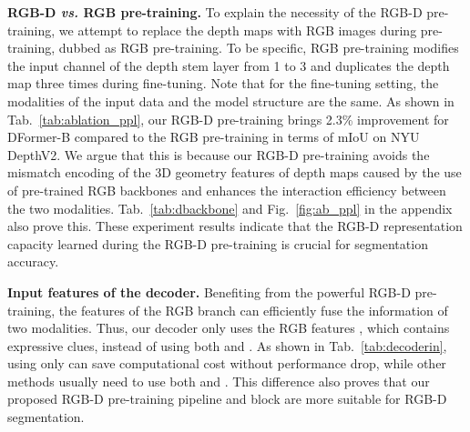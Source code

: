 \documentclass{article}
\newcommand{\figref}[1]{Fig.~\ref{#1}}
\newcommand{\tabref}[1]{Tab.~\ref{#1}}
\newcommand{\myPara}[1]{\vspace{5pt}\noindent\textbf{#1}}
\newcommand{\nMethod}{DFormer}
\begin{document}
\myPara{RGB-D \emph{vs.} RGB pre-training.}
To explain the necessity of the RGB-D pre-training, we attempt to replace the depth maps with RGB images during pre-training, dubbed as RGB pre-training.
To be specific, RGB pre-training modifies the input channel of the depth stem layer from 1 to 3 and duplicates the depth map three times during fine-tuning.
Note that for the fine-tuning setting, the modalities of the input data and the model structure are the same.
As shown in \tabref{tab:ablation_ppl}, our RGB-D pre-training brings 2.3\% improvement for \nMethod{}-B compared to the RGB pre-training in terms of mIoU on NYU DepthV2.
We argue that this is because our RGB-D pre-training avoids the mismatch encoding of the 3D geometry features of depth maps caused by the use of pre-trained RGB backbones and enhances the interaction efficiency between the two modalities.
\tabref{tab:dbackbone} and \figref{fig:ab_ppl} in the appendix also prove this.
These experiment results indicate that the RGB-D representation capacity learned during the RGB-D pre-training is crucial for segmentation accuracy.





















\myPara{Input features of the decoder.}
Benefiting from the powerful RGB-D pre-training, the features of the RGB branch can efficiently fuse the information of two modalities.
Thus, our decoder only uses the RGB features , 
which contains expressive clues, instead of using both  and .
As shown in \tabref{tab:decoderin}, using only  can save computational cost without performance drop, while other methods usually need to use both  and .
This difference also proves that our proposed RGB-D pre-training pipeline and block are more suitable for RGB-D segmentation. 
\end{document}
